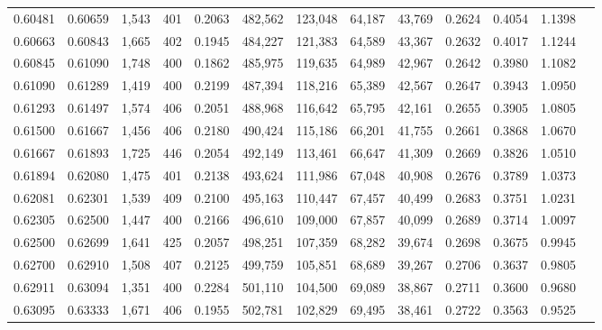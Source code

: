 \begin{tabular}{rrrrrrrrrrrrr}
0.60481 & 0.60659 &  1,543 &   401 &                                     0.2063 & 482,562 & 123,048 &  64,187 &  43,769 & 0.2624 & 0.4054 & 1.1398 \\
0.60663 & 0.60843 &  1,665 &   402 &                                     0.1945 & 484,227 & 121,383 &  64,589 &  43,367 & 0.2632 & 0.4017 & 1.1244 \\
0.60845 & 0.61090 &  1,748 &   400 &                                     0.1862 & 485,975 & 119,635 &  64,989 &  42,967 & 0.2642 & 0.3980 & 1.1082 \\
0.61090 & 0.61289 &  1,419 &   400 &                                     0.2199 & 487,394 & 118,216 &  65,389 &  42,567 & 0.2647 & 0.3943 & 1.0950 \\
0.61293 & 0.61497 &  1,574 &   406 &                                     0.2051 & 488,968 & 116,642 &  65,795 &  42,161 & 0.2655 & 0.3905 & 1.0805 \\
0.61500 & 0.61667 &  1,456 &   406 &                                     0.2180 & 490,424 & 115,186 &  66,201 &  41,755 & 0.2661 & 0.3868 & 1.0670 \\
0.61667 & 0.61893 &  1,725 &   446 &                                     0.2054 & 492,149 & 113,461 &  66,647 &  41,309 & 0.2669 & 0.3826 & 1.0510 \\
0.61894 & 0.62080 &  1,475 &   401 &                                     0.2138 & 493,624 & 111,986 &  67,048 &  40,908 & 0.2676 & 0.3789 & 1.0373 \\
0.62081 & 0.62301 &  1,539 &   409 &                                     0.2100 & 495,163 & 110,447 &  67,457 &  40,499 & 0.2683 & 0.3751 & 1.0231 \\
0.62305 & 0.62500 &  1,447 &   400 &                                     0.2166 & 496,610 & 109,000 &  67,857 &  40,099 & 0.2689 & 0.3714 & 1.0097 \\
0.62500 & 0.62699 &  1,641 &   425 &                                     0.2057 & 498,251 & 107,359 &  68,282 &  39,674 & 0.2698 & 0.3675 & 0.9945 \\
0.62700 & 0.62910 &  1,508 &   407 &                                     0.2125 & 499,759 & 105,851 &  68,689 &  39,267 & 0.2706 & 0.3637 & 0.9805 \\
0.62911 & 0.63094 &  1,351 &   400 &                                     0.2284 & 501,110 & 104,500 &  69,089 &  38,867 & 0.2711 & 0.3600 & 0.9680 \\
0.63095 & 0.63333 &  1,671 &   406 &                                     0.1955 & 502,781 & 102,829 &  69,495 &  38,461 & 0.2722 & 0.3563 & 0.9525 \\

\end{tabular}
